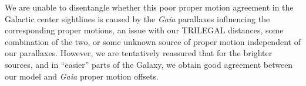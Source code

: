 \documentclass[fleqn,usenatbib]{mnras}
\begin{document}
We are unable to disentangle whether this poor proper motion agreement in the Galactic center sightlines is caused by the \textit{Gaia} parallaxes influencing the corresponding proper motions, an issue with our TRILEGAL distances, some combination of the two, or some unknown source of proper motion independent of our parallaxes.
However, we are tentatively reassured that for the brighter sources, and in ``easier'' parts of the Galaxy, we obtain good agreement between our model and \textit{Gaia} proper motion offsets.







\bsp	%
\label{lastpage}
\end{document}

